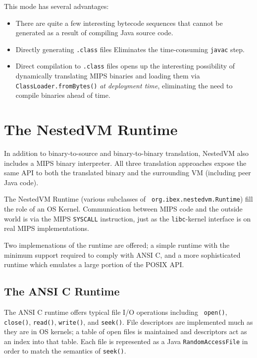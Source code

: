 \documentclass{acmconf}
\begin{document}
This mode has several advantages:

\begin{itemize}
      
\item There are quite a few interesting bytecode sequences that cannot
      be generated as a result of compiling Java source code.

\item Directly generating {\tt .class} files Eliminates the
      time-consuming {\tt javac} step.

\item Direct compilation to {\tt .class} files opens up the
      interesting possibility of dynamically translating MIPS binaries
      and loading them via {\tt ClassLoader.fromBytes()} {\it at
      deployment time}, eliminating the need to compile binaries ahead
      of time.

\end{itemize}

\section{The NestedVM Runtime}

In addition to binary-to-source and binary-to-binary translation,
NestedVM also includes a MIPS binary interpreter.  All three
translation approaches expose the same API to both the translated
binary and the surrounding VM (including peer Java code).

The NestedVM Runtime (various subclasses of {\tt
org.ibex.nestedvm.Runtime}) fill the role of an OS Kernel.
Communication between MIPS code and the outside world is via the MIPS
{\tt SYSCALL} instruction, just as the {\tt libc}-kernel interface is
on real MIPS implementations.

Two implemenations of the runtime are offered; a simple runtime with
the minimum support required to comply with ANSI C, and a more
sophisticated runtime which emulates a large portion of the POSIX API.

\subsection{The ANSI C Runtime}

The ANSI C runtime offers typical file I/O operations including {\tt
open()}, {\tt close()}, {\tt read()}, {\tt write()}, and {\tt seek()}.
File descriptors are implemented much as they are in OS kernels; a
table of open files is maintained and descriptors act as an index into
that table.  Each file is represented as a Java {\tt RandomAccessFile}
in order to match the semantics of {\tt seek()}.
\end{document}

